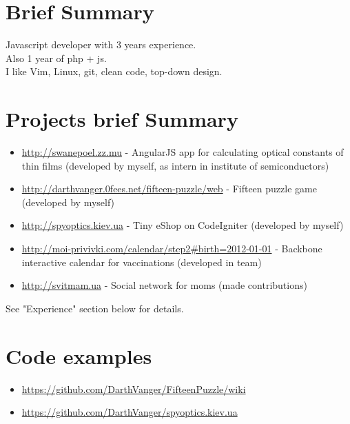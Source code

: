 \documentclass[a4paper, 14pt]{article}
\begin{document}
\begin{center}
	\textsc{\Huge{}}
\end{center}


\section{Brief Summary}
    Javascript developer with 3 years experience.  \\
    Also 1 year of php + js. \\
    I like Vim, Linux, git, clean code, top-down design.

\section{Projects brief Summary}
\begin{itemize}
    \item \url{http://swanepoel.zz.mu} - AngularJS app for calculating optical constants of thin films (developed by myself, as intern in institute of semiconductors)
    \\
    \item \url{http://darthvanger.0fees.net/fifteen-puzzle/web} - Fifteen puzzle game (developed by myself)
    \\
    \item \url{http://spyoptics.kiev.ua} - Tiny eShop on CodeIgniter (developed by myself)
    \\
    \item \url{http://moi-privivki.com/calendar/step2#birth=2012-01-01} - Backbone interactive calendar for vaccinations (developed in team)
    \\
    \item \url{http://svitmam.ua} - Social network for moms (made contributions)
\end{itemize}
See "Experience" section below for details.

\section{Code examples}
\begin{itemize}
    \item \url{https://github.com/DarthVanger/FifteenPuzzle/wiki}
    \\
    \item \url{https://github.com/DarthVanger/spyoptics.kiev.ua}
\end{itemize}
\end{document}
